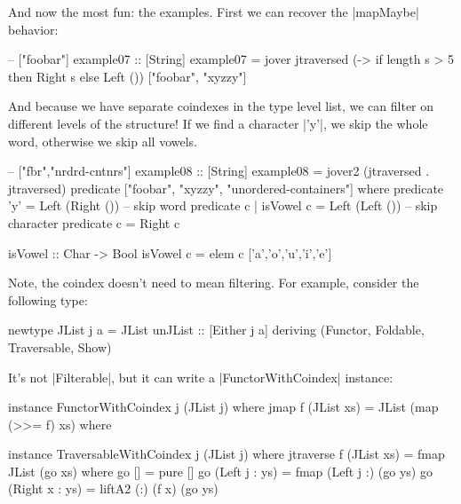 
And now the most fun: the examples.
First we can recover the |mapMaybe| behavior:

\begin{code}
-- ["foobar"]
example07 :: [String]
example07 = jover jtraversed
    (\s -> if length s > 5 then Right s else Left ())
    ["foobar", "xyzzy"]
\end{code}

And because we have separate coindexes in the type level list,
we can filter on different levels of the structure!
If we find a character |'y'|, we skip the whole
word, otherwise we skip all vowels.

\begin{code}
-- ["fbr","nrdrd-cntnrs"]
example08 :: [String]
example08 = jover2 (jtraversed . jtraversed)
    predicate
    ["foobar", "xyzzy", "unordered-containers"]
  where
    predicate 'y'           = Left (Right ())  -- skip word
    predicate c | isVowel c = Left (Left ())   -- skip character
    predicate c             = Right c

isVowel :: Char -> Bool
isVowel c = elem c ['a','o','u','i','e']
\end{code}

Note, the coindex doesn't need to mean filtering.
For example, consider the following type:

\begin{code}
newtype JList j a = JList { unJList :: [Either j a] }
  deriving (Functor, Foldable, Traversable, Show)
\end{code}

It's not |Filterable|, but it can write a |FunctorWithCoindex| instance:

\begin{code}
instance FunctorWithCoindex j (JList j) where
    jmap f (JList xs) = JList (map (>>= f) xs) where

instance TraversableWithCoindex j (JList j) where
    jtraverse f (JList xs) = fmap JList (go xs) where
        go []             = pure []
        go (Left j : ys)  = fmap (Left j :) (go ys)
        go (Right x : ys) = liftA2 (:) (f x) (go ys)
\end{code}

